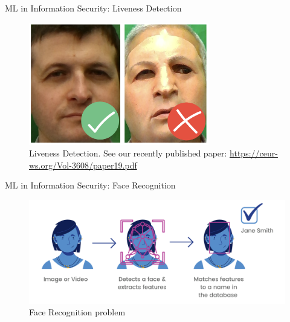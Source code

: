\documentclass{beamer}
\begin{document}
    \begin{frame}{ML in Information Security: Liveness Detection}
	    \begin{figure}
        \centering
            \includegraphics[width=0.7\textwidth]{images/presentation/statement.png}
            \caption{Liveness Detection. See our recently published paper: \href{https://ceur-ws.org/Vol-3608/paper19.pdf}{https://ceur-ws.org/Vol-3608/paper19.pdf}}
        \end{figure}
	\end{frame}

    \begin{frame}{ML in Information Security: Face Recognition}
	    \begin{figure}
        \centering
            \includegraphics[width=\textwidth]{images/presentation/face_recognition.png}
            \caption{Face Recognition problem}
        \end{figure}
	\end{frame}
\end{document}
